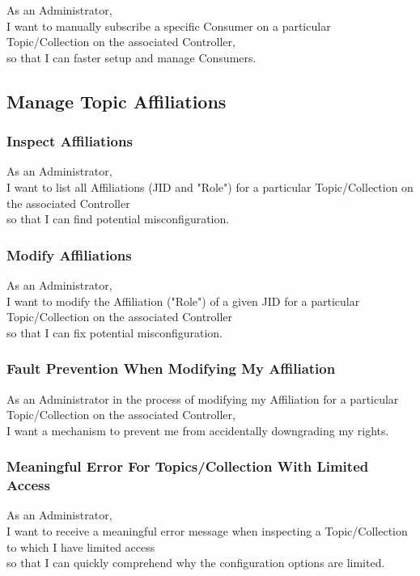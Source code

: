 As an Administrator, \\
I want to manually subscribe a specific Consumer on a particular Topic/Collection on the associated Controller, \\
so that I can faster setup and manage Consumers.

\subsection{Manage Topic Affiliations}
\subsubsection{Inspect Affiliations}

As an Administrator,\\
I want to list all Affiliations (JID and "Role") for a particular Topic/Collection on the associated Controller \\
so that I can find potential misconfiguration.

\subsubsection{Modify Affiliations}

As an Administrator,\\
I want to modify the Affiliation ("Role") of a given JID for a particular Topic/Collection on the associated Controller \\
so that I can fix potential misconfiguration.

\subsubsection{Fault Prevention When Modifying My Affiliation}

As an Administrator in the process of modifying my Affiliation for a particular Topic/Collection on the associated Controller,\\
I want a mechanism to prevent me from accidentally downgrading my rights.

\subsubsection{Meaningful Error For Topics/Collection With Limited Access}

As an Administrator,\\
I want to receive a meaningful error message when inspecting a Topic/Collection to which I have limited access \\
so that I can quickly comprehend why the configuration options are limited.

